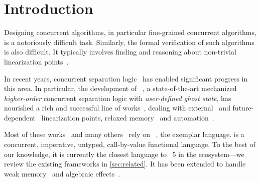 \section{Introduction}
\label{sec:introduction}

Designing concurrent algorithms, in particular fine-grained concurrent algorithms, is a notoriously difficult task.
Similarly, the formal verification of such algorithms is also difficult.
It typically involves finding and reasoning about non-trivial linearization points~\cite{DBLP:journals/csur/DongolD15,DBLP:journals/pacmpl/JungLPRTDJ20,DBLP:conf/cpp/VindumB21,DBLP:conf/cpp/VindumFB22,DBLP:conf/osdi/Chang0STKZ23}.

In recent years, concurrent separation logic~\cite{DBLP:journals/siglog/BrookesO16} has enabled significant progress in this area.
In particular, the development of \Iris~\cite{DBLP:journals/jfp/JungKJBBD18}, a state-of-the-art mechanized \emph{higher-order} concurrent separation logic with \emph{user-defined ghost state}, has nourished a rich and successful line of works~\cite{DBLP:journals/pacmpl/JungLPRTDJ20,DBLP:conf/cpp/VindumB21,DBLP:conf/cpp/VindumFB22,DBLP:conf/osdi/Chang0STKZ23,DBLP:conf/cpp/CarbonneauxZKON22,DBLP:journals/pacmpl/JungLCKPK23,DBLP:journals/pacmpl/SomersK24,DBLP:journals/pacmpl/MevelJP20,DBLP:journals/pacmpl/MevelJ21,DBLP:conf/pldi/DangJCNMKD22,DBLP:journals/pacmpl/ParkKMJLKK24,DBLP:conf/pldi/MulderKG22,DBLP:journals/pacmpl/MulderK23}, dealing with external~\cite{DBLP:conf/cpp/VindumFB22} and future-dependent~\cite{DBLP:journals/pacmpl/JungLPRTDJ20,DBLP:conf/cpp/VindumB21,DBLP:conf/osdi/Chang0STKZ23} linearization points, relaxed memory~\cite{DBLP:journals/pacmpl/MevelJP20,DBLP:journals/pacmpl/MevelJ21,DBLP:conf/pldi/DangJCNMKD22,DBLP:journals/pacmpl/ParkKMJLKK24} and automation~\cite{DBLP:conf/pldi/MulderKG22,DBLP:journals/pacmpl/MulderK23}.

Most of these works~\cite{DBLP:journals/pacmpl/JungLPRTDJ20,DBLP:conf/cpp/VindumB21,DBLP:conf/cpp/VindumFB22,DBLP:conf/cpp/CarbonneauxZKON22,DBLP:journals/pacmpl/JungLCKPK23,DBLP:journals/pacmpl/SomersK24,DBLP:conf/pldi/MulderKG22,DBLP:journals/pacmpl/MulderK23} and many others~\cite{DBLP:journals/pacmpl/VilhenaPJ20,DBLP:journals/pacmpl/PottierGJM24,DBLP:journals/pacmpl/TimanyGB24,DBLP:journals/pacmpl/LorenzenLSL24} rely on \HeapLang~\cite{heaplang}, the exemplar \Iris language.
\HeapLang is a concurrent, imperative, untyped, call-by-value functional language.
To the best of our knowledge, it is currently the closest language to \OCaml~5 in the \Iris ecosystem---we review the existing frameworks in \cref{sec:related}.
It has been extended to handle weak memory~\cite{DBLP:journals/pacmpl/MevelJP20} and algebraic effects~\cite{DBLP:journals/pacmpl/VilhenaP21}.

